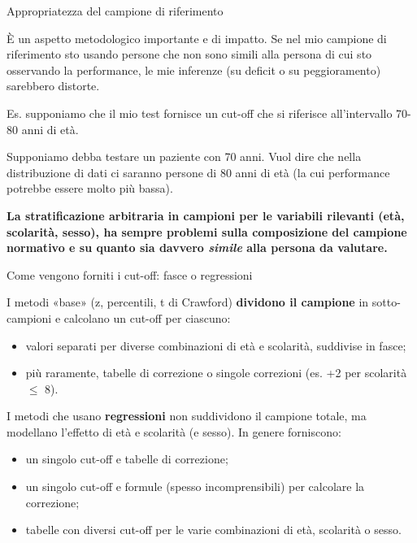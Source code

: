 \documentclass[
  ignorenonframetext,
  aspectratio=169,
]{beamer}
\providecommand{\tightlist}{%
  \setlength{\itemsep}{0pt}\setlength{\parskip}{0pt}}
\begin{document}
\begin{frame}{Appropriatezza del campione di riferimento}
\label{appropriatezza-del-campione-di-riferimento}
\small

È un aspetto metodologico importante e di impatto. Se nel mio campione
di riferimento sto usando persone che non sono simili alla persona di
cui sto osservando la performance, le mie inferenze (su deficit o su
peggioramento) sarebbero distorte.

Es. supponiamo che il mio test fornisce un cut-off che si riferisce
all'intervallo 70-80 anni di età.

Supponiamo debba testare un paziente con 70 anni. Vuol dire che nella
distribuzione di dati ci saranno persone di 80 anni di età (la cui
performance potrebbe essere molto più bassa).

\textbf{La stratificazione arbitraria in campioni per le variabili
rilevanti (età, scolarità, sesso), ha sempre problemi sulla composizione
del campione normativo e su quanto sia davvero \textit{simile} alla
persona da valutare.}
\end{frame}

\begin{frame}{Come vengono forniti i cut-off: fasce o regressioni}
\label{come-vengono-forniti-i-cut-off-fasce-o-regressioni}
\small

I metodi «base» (z, percentili, t di Crawford) \textbf{dividono il
campione} in sotto-campioni e calcolano un cut-off per ciascuno:

\begin{itemize}
\tightlist
\item
  valori separati per diverse combinazioni di età e scolarità, suddivise
  in fasce;
\item
  più raramente, tabelle di correzione o singole correzioni (es. +2 per
  scolarità \(\leq\) 8).
\end{itemize}

I metodi che usano \textbf{regressioni} non suddividono il campione
totale, ma modellano l'effetto di età e scolarità (e sesso). In genere
forniscono:

\begin{itemize}
\tightlist
\item
  un singolo cut-off e tabelle di correzione;
\item
  un singolo cut-off e formule (spesso incomprensibili) per calcolare la
  correzione;
\item
  tabelle con diversi cut-off per le varie combinazioni di età,
  scolarità o sesso.
\end{itemize}
\end{frame}
\end{document}
